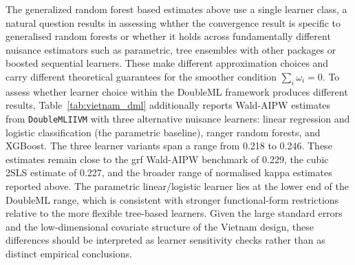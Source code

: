 \documentclass[12pt, a4paper, oneside]{article}
\theoremstyle{plain}
\theoremstyle{definition}
\begin{document}
The generalized random forest based estimates above use a single learner class, a natural question results in assessing whther the convergence result is specific to generalised random forests or whether it holds across fundamentally different nuisance estimators such as parametric, tree ensembles with other packages or boosted sequential learners.
These make different approximation choices and carry different theoretical guarantees for the smoother condition $\sum_i \omega_i = 0$.
To assess whether learner choice within the DoubleML framework
produces different results, Table~\ref{tab:vietnam_dml} additionally
reports Wald-AIPW estimates from \texttt{DoubleMLIIVM} with three
alternative nuisance learners: linear regression and logistic
classification (the parametric baseline), ranger random forests, and
XGBoost.
The three learner variants span a range from 0.218 to 0.246. These estimates remain close to the grf Wald-AIPW benchmark of 0.229, the cubic 2SLS
estimate of 0.227, and the broader range of normalised kappa estimates reported
above. The parametric linear/logistic learner lies at the lower end of the
DoubleML range, which is consistent with stronger functional-form restrictions
relative to the more flexible tree-based learners. Given the large standard
errors and the low-dimensional covariate structure of the Vietnam design, these
differences should be interpreted as learner sensitivity checks rather than as
distinct empirical conclusions.
\end{document}
